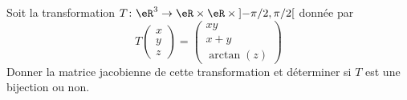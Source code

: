 
\begin{exercice}\label{exoOutilsMath-0136}

    Soit la transformation \( T\colon \eR^3\to \eR\times \eR\times \mathopen] -\pi/2 , \pi/2 \mathclose[\) donnée par
    \begin{equation}
        T\begin{pmatrix}
            x    \\ 
            y    \\ 
            z    
        \end{pmatrix}=\begin{pmatrix}
            xy    \\ 
            x+y    \\ 
            \arctan(z)    
        \end{pmatrix}
    \end{equation}
    Donner la matrice jacobienne de cette transformation et déterminer si \( T\) est une bijection ou non.

\end{exercice}
